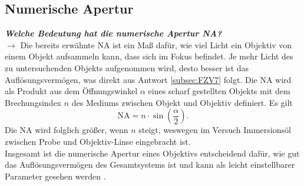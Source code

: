\subsection{\label{subsec:FZV9}Numerische Apertur}
\textbf{\textit{Welche Bedeutung hat die numerische Apertur NA?}} \\
$\rightarrow$
Die bereits erwähnte NA ist ein Maß dafür, wie viel Licht ein Objektiv von einem 
Objekt aufsammeln kann, dass sich im Fokus befindet. Je mehr Licht des zu untersuchenden 
Objekts aufgenommen wird, desto besser ist das Auflösungsvermögen, was direkt aus 
Antwort \ref{subsec:FZV7} folgt. Die NA wird als Produkt aus dem Öffnungswinkel $\alpha$ eines
scharf gestellten Objekts mit dem Brechungsindex $n$ des Mediums zwischen Objekt und Objektiv 
definiert. Es gilt
\begin{equation}
    \text{NA} = n\cdot\sin(\frac{\alpha}{2}).
\end{equation}
Die NA wird folglich größer, wenn $n$ steigt, weswegen im Versuch Immersionsöl zwischen 
Probe und Objektiv-Linse eingebracht ist. \\
Insgesamt ist die numerische Apertur eines Objektivs entscheidend dafür, wie 
gut das Auflösungsvermögen des Gesamtsystems ist und kann als leicht einstellbarer 
Parameter gesehen werden \cite{Auf1, Auf2, Auf3}. \newpage
